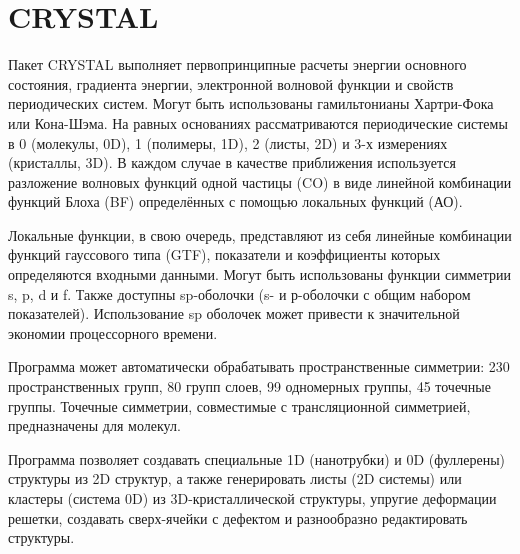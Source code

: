 \section{CRYSTAL}
Пакет CRYSTAL выполняет первопринципные расчеты энергии основного состояния, градиента энергии, электронной волновой функции и свойств периодических систем. Могут быть использованы гамильтонианы Хартри-Фока или Кона-Шэма. На равных основаниях рассматриваются периодические системы в 0 (молекулы, 0D), 1 (полимеры, 1D), 2 (листы, 2D) и 3-х измерениях (кристаллы, 3D). В каждом случае в качестве приближения используется разложение волновых функций одной частицы (CO) в виде линейной комбинации функций Блоха (BF) определённых с помощью локальных функций (АО).

Локальные функции, в свою очередь, представляют из себя линейные комбинации функций гауссового типа (GTF), показатели и коэффициенты которых определяются входными данными. Могут быть использованы функции симметрии s, p, d и f. Также доступны sp-оболочки (s- и р-оболочки с общим набором показателей). Использование sp оболочек может привести к значительной экономии процессорного времени.

Программа может автоматически обрабатывать пространственные симметрии: 230 пространственных групп, 80 групп слоев, 99 одномерных группы, 45 точечные группы. Точечные симметрии, совместимые с трансляционной симметрией, предназначены для молекул.

Программа позволяет создавать специальные 1D (нанотрубки) и 0D (фуллерены) структуры из 2D структур, а также генерировать листы (2D системы) или кластеры (система 0D) из 3D-кристаллической структуры, упругие деформации решетки, создавать сверх-ячейки с дефектом и разнообразно редактировать структуры.\cite{crystal}
